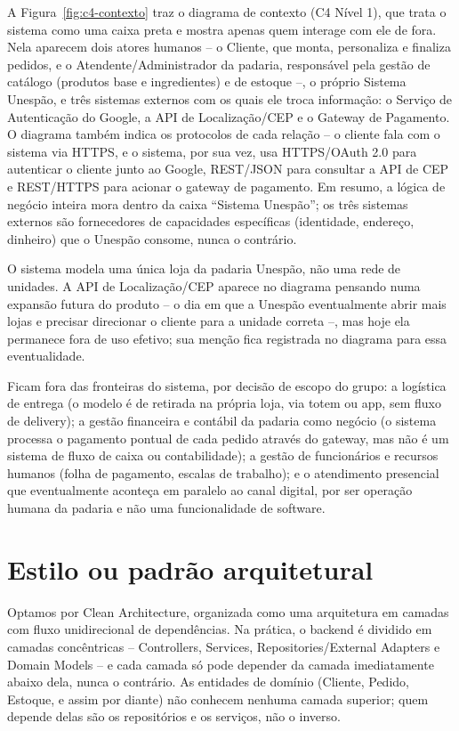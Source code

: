 \documentclass[a4paper,12pt,oneside,openany]{book}
\begin{document}
A Figura~\ref{fig:c4-contexto} traz o diagrama de contexto (C4 Nível 1), que trata o sistema como uma caixa preta e mostra apenas quem interage com ele de fora. Nela aparecem dois atores humanos -- o Cliente, que monta, personaliza e finaliza pedidos, e o Atendente/Administrador da padaria, responsável pela gestão de catálogo (produtos base e ingredientes) e de estoque --, o próprio Sistema Unespão, e três sistemas externos com os quais ele troca informação: o Serviço de Autenticação do Google, a API de Localização/CEP e o Gateway de Pagamento. O diagrama também indica os protocolos de cada relação -- o cliente fala com o sistema via HTTPS, e o sistema, por sua vez, usa HTTPS/OAuth 2.0 para autenticar o cliente junto ao Google, REST/JSON para consultar a API de CEP e REST/HTTPS para acionar o gateway de pagamento. Em resumo, a lógica de negócio inteira mora dentro da caixa ``Sistema Unespão''; os três sistemas externos são fornecedores de capacidades específicas (identidade, endereço, dinheiro) que o Unespão consome, nunca o contrário.

O sistema modela uma única loja da padaria Unespão, não uma rede de unidades. A API de Localização/CEP aparece no diagrama pensando numa expansão futura do produto -- o dia em que a Unespão eventualmente abrir mais lojas e precisar direcionar o cliente para a unidade correta --, mas hoje ela permanece fora de uso efetivo; sua menção fica registrada no diagrama para essa eventualidade.

Ficam fora das fronteiras do sistema, por decisão de escopo do grupo: a logística de entrega (o modelo é de retirada na própria loja, via totem ou app, sem fluxo de delivery); a gestão financeira e contábil da padaria como negócio (o sistema processa o pagamento pontual de cada pedido através do gateway, mas não é um sistema de fluxo de caixa ou contabilidade); a gestão de funcionários e recursos humanos (folha de pagamento, escalas de trabalho); e o atendimento presencial que eventualmente aconteça em paralelo ao canal digital, por ser operação humana da padaria e não uma funcionalidade de software.

\section{Estilo ou padrão arquitetural}

Optamos por Clean Architecture, organizada como uma arquitetura em camadas com fluxo unidirecional de dependências. Na prática, o backend é dividido em camadas concêntricas -- Controllers, Services, Repositories/External Adapters e Domain Models -- e cada camada só pode depender da camada imediatamente abaixo dela, nunca o contrário. As entidades de domínio (Cliente, Pedido, Estoque, e assim por diante) não conhecem nenhuma camada superior; quem depende delas são os repositórios e os serviços, não o inverso.
\end{document}
